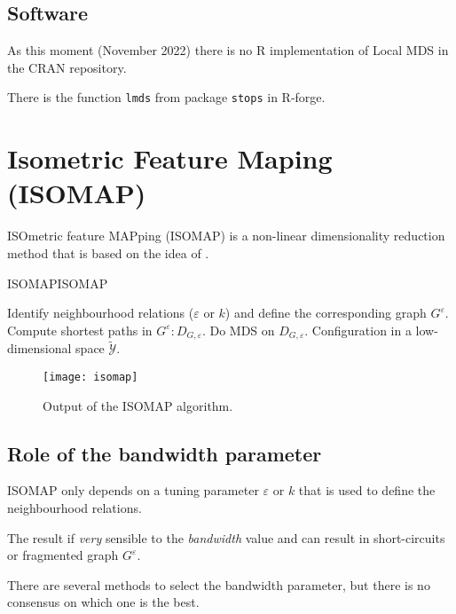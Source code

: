 \subsection{Software}

As this moment (November 2022) there is no R implementation of Local MDS
in the CRAN repository.

There is the function \texttt{lmds} from package \texttt{stops} in R-forge.


\clearpage
\section{Isometric Feature Maping (ISOMAP)}

ISOmetric feature MAPping (ISOMAP) is a non-linear dimensionality reduction
method that is based on the idea of .

\begin{algorithm}{ISOMAP}{ISOMAP}
	\begin{algorithmic}[1]
		 
		\State Identify neighbourhood relations ($\varepsilon$ or $k$) and define the
		corresponding graph $G^\varepsilon$.
		\State Compute shortest paths in $G^\varepsilon: D_{G,\varepsilon}$.
		\State Do MDS on $D_{G,\varepsilon}$.
		\State \Return Configuration in a low-dimensional space $\mathcal{\tilde{Y}}$.
		\EndProcedure
	\end{algorithmic}
\end{algorithm}

\begin{figure}[H]
	\texttt{[image: isomap]}
	\caption{Output of the ISOMAP algorithm.}
\end{figure}

\subsection{Role of the bandwidth parameter}
ISOMAP only depends on a tuning parameter $\varepsilon$ or $k$ that is used to
define the neighbourhood relations.

\begin{marker}
    The result if \emph{very} sensible to the \emph{bandwidth} value and can result
	in short-circuits or fragmented graph $G^\varepsilon$.
\end{marker}

There are several methods to select the bandwidth parameter, but there
is no consensus on which one is the best.

